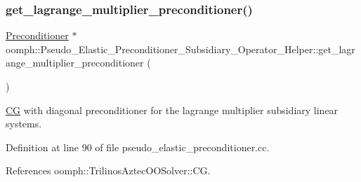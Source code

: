 \subsubsection{\texorpdfstring{get\+\_\+lagrange\+\_\+multiplier\+\_\+preconditioner()}{get\_lagrange\_multiplier\_preconditioner()}}
{\footnotesize\ttfamily \hyperlink{classoomph_1_1Preconditioner}{Preconditioner} $\ast$ oomph\+::\+Pseudo\+\_\+\+Elastic\+\_\+\+Preconditioner\+\_\+\+Subsidiary\+\_\+\+Operator\+\_\+\+Helper\+::get\+\_\+lagrange\+\_\+multiplier\+\_\+preconditioner (\begin{DoxyParamCaption}{ }\end{DoxyParamCaption})}



\hyperlink{classoomph_1_1CG}{CG} with diagonal preconditioner for the lagrange multiplier subsidiary linear systems. 



Definition at line 90 of file pseudo\+\_\+elastic\+\_\+preconditioner.\+cc.



References oomph\+::\+Trilinos\+Aztec\+O\+O\+Solver\+::\+CG.

